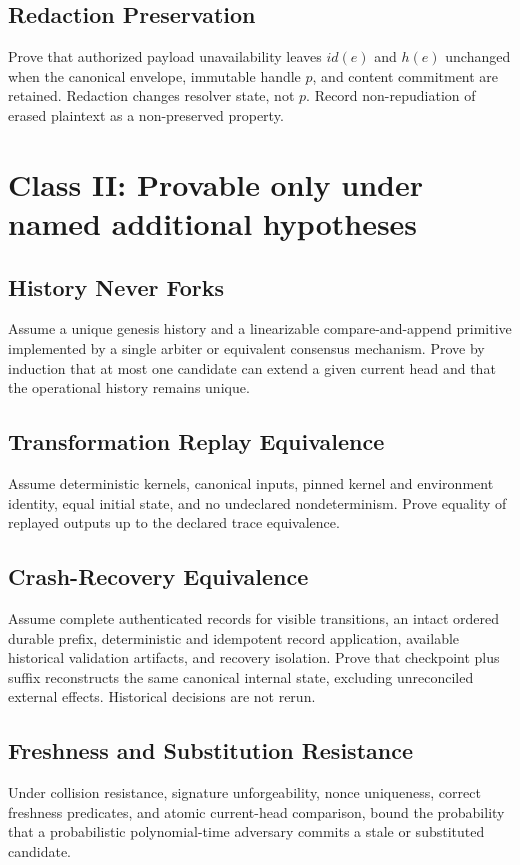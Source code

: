 \documentclass[11pt,openany]{book}
\begin{document}
\subsection{Redaction Preservation}
Prove that authorized payload unavailability leaves \(id(e)\) and \(h(e)\)
unchanged when the canonical envelope, immutable handle \(p\), and content
commitment are retained. Redaction changes resolver state, not \(p\).
Record non-repudiation of erased plaintext as a non-preserved property.

\section{Class II: Provable only under named additional hypotheses}

\subsection{History Never Forks}
Assume a unique genesis history and a linearizable compare-and-append primitive
implemented by a single arbiter or equivalent consensus mechanism. Prove by
induction that at most one candidate can extend a given current head and that
the operational history remains unique.

\subsection{Transformation Replay Equivalence}
Assume deterministic kernels, canonical inputs, pinned kernel and environment
identity, equal initial state, and no undeclared nondeterminism. Prove equality
of replayed outputs up to the declared trace equivalence.

\subsection{Crash-Recovery Equivalence}
Assume complete authenticated records for visible transitions, an intact
ordered durable prefix, deterministic and idempotent record application,
available historical validation artifacts, and recovery isolation. Prove that
checkpoint plus suffix reconstructs the same canonical internal state,
excluding unreconciled external effects. Historical decisions are not rerun.

\subsection{Freshness and Substitution Resistance}
Under collision resistance, signature unforgeability, nonce uniqueness,
correct freshness predicates, and atomic current-head comparison, bound the
probability that a probabilistic polynomial-time adversary commits a stale or
substituted candidate.
\end{document}

